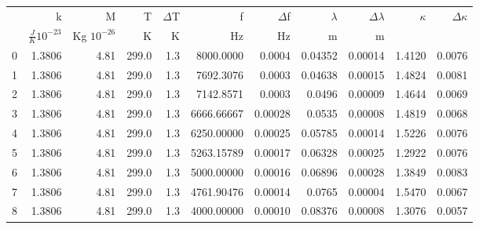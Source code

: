 \documentclass[a4paper,10pt]{article}
\begin{document}
\begin{tabular}{lrrrrrrrrrr}
\toprule
{} &             k &             M &      T &  $\Delta$T &            f &  $\Delta$f &  $\lambda$ &  $\Delta \lambda$ &  $ \kappa$ &  $\Delta \kappa$ \\
{} & $\frac{J}{K} 10^{-23}$ & Kg $10^{-26}$ & K & K & Hz & Hz & m & m &&\\
\midrule
0 &  1.3806 &  4.81 &  299.0 &   1.3 &  8000.0000 &   0.0004 &   0.04352 &     0.00014 &   1.4120 &   0.0076 \\
1 &  1.3806 &  4.81 &  299.0 &   1.3 &  7692.3076 &   0.0003 &   0.04638 &     0.00015 &   1.4824 &   0.0081 \\
2 &  1.3806 &  4.81 &  299.0 &   1.3 &  7142.8571 &   0.0003 &   0.0496 &      0.00009 &   1.4644 &   0.0069 \\
3 &  1.3806 &  4.81 &  299.0 &   1.3 &  6666.66667 &   0.00028 &   0.0535 &      0.00008 &   1.4819 &   0.0068 \\
4 &  1.3806 &  4.81 &  299.0 &   1.3 &  6250.00000 &   0.00025 &   0.05785 &     0.00014 &    1.5226 &   0.0076 \\
5 &  1.3806 &  4.81 &  299.0 &   1.3 &  5263.15789 &   0.00017 &   0.06328 &     0.00025 &    1.2922 &   0.0076 \\
6 &  1.3806 &  4.81 &  299.0 &   1.3 &  5000.00000 &   0.00016 &   0.06896 &     0.00028 &    1.3849 &   0.0083 \\
7 &  1.3806 &  4.81 &  299.0 &   1.3 &  4761.90476 &   0.00014 &   0.0765 &      0.00004 &    1.5470 &   0.0067 \\
8 &  1.3806 &  4.81 &  299.0 &   1.3 &  4000.00000 &   0.00010 &   0.08376 &      0.00008 &    1.3076 &   0.0057 \\
\bottomrule
\end{tabular}
\end{document}
